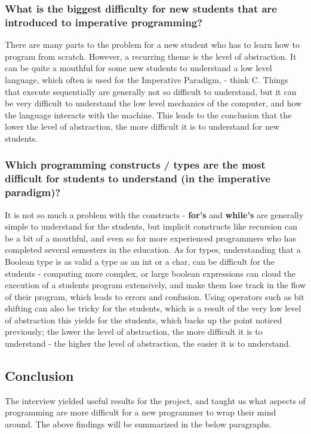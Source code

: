 \subsubsection{What is the biggest difficulty for new students that are introduced to imperative programming?}

There are many parts to the problem for a new student who has to learn how to program from scratch. However, a recurring theme is the level of 
abstraction. It can be quite a mouthful for some new students to understand a low level language, which often is used for the Imperative Paradigm, - 
think C. Things that execute sequentially are generally not so difficult to understand, but it can be very difficult to understand the low level 
mechanics of the computer, and how the language interacts with the machine. This leads to the conclusion that the lower the level of abstraction, the 
more difficult it is to understand for new students.

\subsubsection{Which programming constructs / types are the most difficult for students to understand (in the imperative paradigm)?}

It is not so much a problem with the constructs - \textbf{for's} and \textbf{while's} are generally simple to understand for the students, but implicit 
constructs like recursion can be a bit of a mouthful, and even so for more experienced programmers who has completed several semesters in the 
education. As for types, understanding that a Boolean type is as valid a type as an int or a char, can be difficult for the students - computing more 
complex, or large boolean expressions can cloud the execution of a students program extensively, and make them lose track in the flow of their program, 
which leads to errors and confusion. Using operators such as bit shifting can also be tricky for the students, which is a result of the very low level 
of abstraction this yields for the students, which backs up the point noticed previously; the lower the level of abstraction, the more difficult it is 
to understand - the higher the level of abstraction, the easier it is to understand.


\subsection{Conclusion}

The interview yielded useful results for the project, and taught us what aspects of programming are more difficult for a new programmer to wrap 
their mind around. The above findings will be summarized in the below paragraphs.

